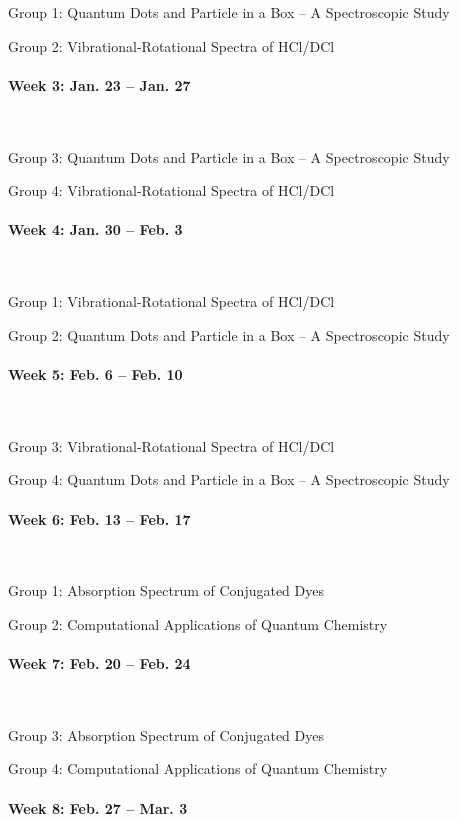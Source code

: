 \documentclass[12pt, letterpaper]{article}
\begin{document}
Group 1: Quantum Dots and Particle in a Box – A Spectroscopic Study

Group 2: Vibrational-Rotational Spectra of HCl/DCl
\paragraph{Week 3: Jan. 23 -- Jan. 27}~

Group 3: Quantum Dots and Particle in a Box – A Spectroscopic Study

Group 4: Vibrational-Rotational Spectra of HCl/DCl

\paragraph{Week 4: Jan. 30 -- Feb. 3}~

Group 1: Vibrational-Rotational Spectra of HCl/DCl

Group 2: Quantum Dots and Particle in a Box – A Spectroscopic Study
\paragraph{Week 5: Feb. 6 -- Feb. 10}~

Group 3: Vibrational-Rotational Spectra of HCl/DCl

Group 4: Quantum Dots and Particle in a Box – A Spectroscopic Study

\paragraph{Week 6: Feb. 13 -- Feb. 17}~

Group 1: Absorption Spectrum of Conjugated Dyes

Group 2: Computational Applications of Quantum Chemistry

\paragraph{Week 7: Feb. 20 -- Feb. 24}~

Group 3: Absorption Spectrum of Conjugated Dyes

Group 4: Computational Applications of Quantum Chemistry

\paragraph{Week 8: Feb. 27 -- Mar. 3}~
\end{document}
